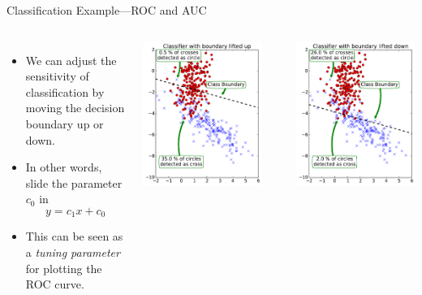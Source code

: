 \documentclass[10pt, aspectratio=169]{beamer} %
\begin{document}
\begin{frame}{Classification Example---ROC and AUC}
\begin{columns}
\begin{itemize}
\item We can adjust the sensitivity of classification by moving the decision boundary up or down.
\item In other words, slide the parameter $c_0$ in 
\[
y = c_1 x + c_0
\]
\item This can be seen as a \textit{tuning parameter} for plotting the ROC curve.
\end{itemize}
\vspace*{0.5cm}
\centerline{\includegraphics[width=0.8\columnwidth]{2classBoundary_lowSensitivity.pdf}}\\
\centerline{\includegraphics[width=0.8\columnwidth]{2classBoundary_highSensitivity.pdf}}

\end{columns}
\end{frame}
\end{document}
